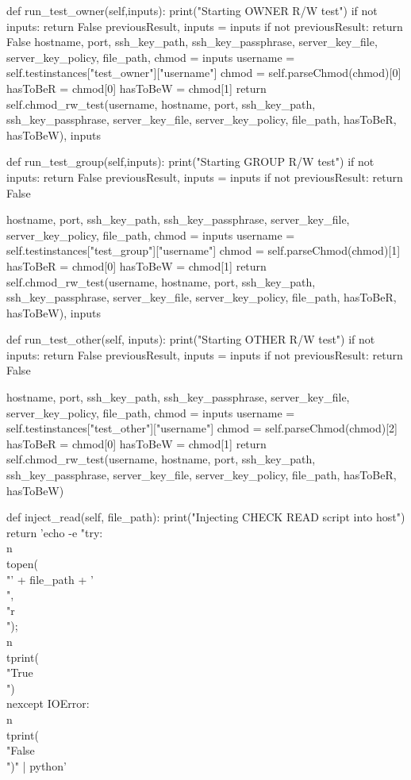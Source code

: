 \begin{python}
	def run_test_owner(self,inputs):
		print("Starting OWNER R/W test")
		if not inputs:
			return False
		previousResult, inputs = inputs
		if not previousResult:
			return False
		hostname, port, ssh_key_path, ssh_key_passphrase, server_key_file, server_key_policy, file_path, chmod = inputs
		username = self.testinstances["test_owner"]["username"]
		chmod = self.parseChmod(chmod)[0]
		hasToBeR = chmod[0]
		hasToBeW = chmod[1]
		return self.chmod_rw_test(username, hostname, port, ssh_key_path, ssh_key_passphrase, server_key_file, server_key_policy, file_path, hasToBeR, hasToBeW), inputs

	def run_test_group(self,inputs):
		print("Starting GROUP R/W test")
		if not inputs:
			return False
		previousResult, inputs = inputs
		if not previousResult:
			return False

		hostname, port, ssh_key_path, ssh_key_passphrase, server_key_file, server_key_policy, file_path, chmod = inputs
		username = self.testinstances["test_group"]["username"]
		chmod = self.parseChmod(chmod)[1]
		hasToBeR = chmod[0]
		hasToBeW = chmod[1]
		return self.chmod_rw_test(username, hostname, port, ssh_key_path, ssh_key_passphrase, server_key_file, server_key_policy, file_path, hasToBeR, hasToBeW), inputs

	def run_test_other(self, inputs):
		print("Starting OTHER R/W test")
		if not inputs:
			return False
		previousResult, inputs = inputs
		if not previousResult:
			return False
			
		hostname, port, ssh_key_path, ssh_key_passphrase, server_key_file, server_key_policy, file_path, chmod = inputs
		username = self.testinstances["test_other"]["username"]
		chmod = self.parseChmod(chmod)[2]
		hasToBeR = chmod[0]
		hasToBeW = chmod[1]
		return self.chmod_rw_test(username, hostname, port, ssh_key_path, ssh_key_passphrase, server_key_file, server_key_policy, file_path, hasToBeR, hasToBeW)


	def inject_read(self, file_path):
		print("Injecting CHECK READ script into host")
		return 'echo -e "try:\\n\\topen(\\"' + file_path + '\\",\\"r\\");\\n\\tprint(\\"True\\")\\nexcept IOError:\\n\\tprint(\\"False\\")" | python'


\end{python}
